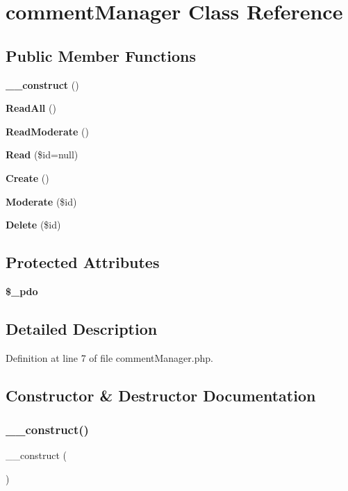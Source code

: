 \section{comment\+Manager Class Reference}
\label{class_src_1_1_managers_1_1comment_manager}
\subsection*{Public Member Functions}
\begin{DoxyCompactItemize}
\item 
\textbf{ \+\_\+\+\_\+construct} ()
\item 
\textbf{ Read\+All} ()
\item 
\textbf{ Read\+Moderate} ()
\item 
\textbf{ Read} (\$id=null)
\item 
\textbf{ Create} ()
\item 
\textbf{ Moderate} (\$id)
\item 
\textbf{ Delete} (\$id)
\end{DoxyCompactItemize}
\subsection*{Protected Attributes}
\begin{DoxyCompactItemize}
\item 
\textbf{ \$\+\_\+pdo}
\end{DoxyCompactItemize}


\subsection{Detailed Description}


Definition at line 7 of file comment\+Manager.\+php.



\subsection{Constructor \& Destructor Documentation}
\mbox{\label{class_src_1_1_managers_1_1comment_manager_a095c5d389db211932136b53f25f39685}} 
\subsubsection{\+\_\+\+\_\+construct()}
{\footnotesize\ttfamily \+\_\+\+\_\+construct (\begin{DoxyParamCaption}{ }\end{DoxyParamCaption})}




